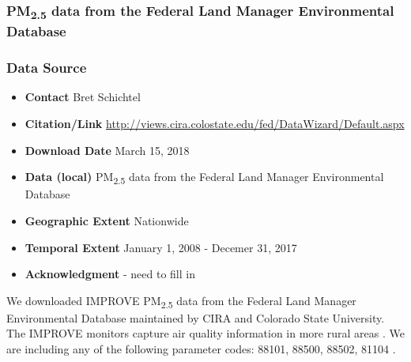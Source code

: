 \subsubsection{\texorpdfstring{PM\textsubscript{2.5}}{} data from the Federal Land Manager Environmental Database} \label{IMPROVE}

\subsubsection*{Data Source}

\begin{itemize}[nolistsep]
\item \textbf{Contact} Bret Schichtel
\item \textbf{Citation/Link} \url{http://views.cira.colostate.edu/fed/DataWizard/Default.aspx}
\item \textbf{Download Date} March 15, 2018%
\item \textbf{Data (local)} PM\textsubscript{2.5} data from the Federal Land Manager Environmental Database
\item \textbf{Geographic Extent} Nationwide
\item \textbf{Temporal Extent} January 1, 2008 - Decemer 31, 2017 %
\item \textbf{Acknowledgment} - need to fill in
\end{itemize}



We downloaded IMPROVE PM\textsubscript{2.5} data from the Federal Land Manager Environmental Database maintained by CIRA and Colorado State University. The IMPROVE monitors capture air quality information in more rural areas \citep{EPANPM25IMPROVE2017}. We are including any of the following parameter codes: 88101, 88500, 88502, 81104 \citep{EPANPM25Memo2017,EPANPM25Parameters2017,EPANAllParameters2017}.

